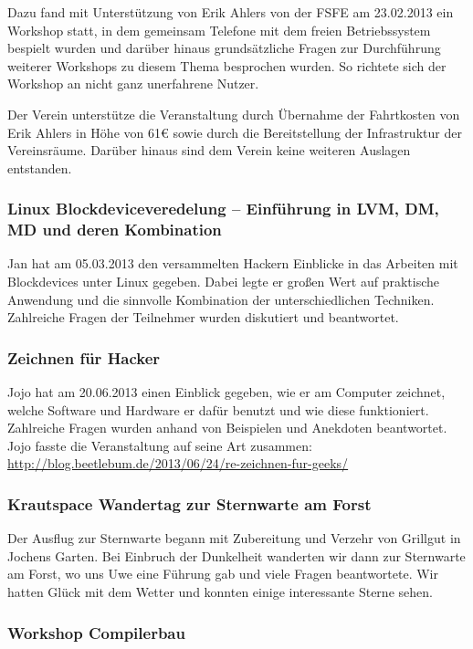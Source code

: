 \documentclass[10pt,DIV16]{scrartcl}
\begin{document}
Dazu fand mit Unterstützung von Erik Ahlers von der FSFE am 23.02.2013
ein Workshop statt, in dem gemeinsam Telefone mit dem freien
Betriebssystem bespielt wurden und darüber hinaus grundsätzliche
Fragen zur Durchführung weiterer Workshops zu diesem Thema
besprochen wurden. So richtete sich der Workshop an nicht ganz
unerfahrene Nutzer.

Der Verein unterstütze die Veranstaltung durch Übernahme der
Fahrtkosten von Erik Ahlers in Höhe von 61\euro{} sowie durch die
Bereitstellung der Infrastruktur der Vereinsräume. Darüber hinaus
sind dem Verein keine weiteren Auslagen entstanden.

\subsubsection{Linux Blockdeviceveredelung -- Einführung in LVM, DM, MD und deren Kombination}

Jan hat am 05.03.2013 den versammelten Hackern Einblicke in das
Arbeiten mit Blockdevices unter Linux gegeben. Dabei legte er großen
Wert auf praktische Anwendung und die sinnvolle Kombination der
unterschiedlichen Techniken. Zahlreiche Fragen der Teilnehmer wurden
diskutiert und beantwortet.

\subsubsection{Zeichnen für Hacker}

Jojo hat am 20.06.2013 einen Einblick gegeben, wie er am Computer
zeichnet, welche Software und Hardware er dafür benutzt und wie diese
funktioniert. Zahlreiche Fragen wurden anhand von Beispielen und
Anekdoten beantwortet. Jojo fasste die Veranstaltung auf seine Art
zusammen:
\url{http://blog.beetlebum.de/2013/06/24/re-zeichnen-fur-geeks/}

\subsubsection{Krautspace Wandertag zur Sternwarte am Forst}

Der Ausflug zur Sternwarte begann mit Zubereitung und Verzehr von Grillgut in
Jochens Garten. Bei Einbruch der Dunkelheit wanderten wir dann zur Sternwarte
am Forst, wo uns Uwe eine Führung gab und viele Fragen beantwortete. Wir
hatten Glück mit dem Wetter und konnten einige interessante Sterne sehen.

\subsubsection{Workshop Compilerbau}
\end{document}
